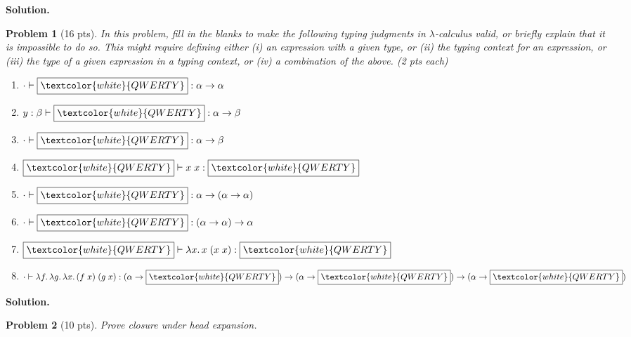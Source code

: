 \documentclass{article}
\newcommand{\lc}{$\lambda$-calculus}
\newcommand{\elam}[2]{\lambda{#1}.\,{#2}}
\newcommand{\eapp}[2]{#1 \; #2}
\newcommand{\emptybox}{\boxed{\textcolor{white}{QWERTY}}}
\newtheorem{problem}{Problem}
\newenvironment{solution}{\textbf{Solution.}}{}
\begin{document}
\begin{solution}

\end{solution}


\begin{problem}[16 pts]
    In this problem, fill in the blanks to make the following typing judgments in \lc{} valid, or briefly explain
    that it is impossible to do so. This might require defining either (i) an expression with a given type,
    or (ii) the typing context for an expression,
    or (iii) the type of a given expression in a typing context,
    or (iv) a combination of the above. (2 pts each)

    \begin{enumerate}
        \item $\cdot \vdash \emptybox : \alpha \rightarrow \alpha$
        
        \item $y : \beta \vdash \emptybox : \alpha \rightarrow \beta$
        
        \item $\cdot \vdash \emptybox : \alpha \rightarrow \beta$
        
        \item $\emptybox \vdash \eapp{x}{x} : \emptybox$
        
        \item $\cdot \vdash \emptybox : \alpha \rightarrow (\alpha \rightarrow \alpha)$
        
        \item $\cdot \vdash \emptybox : (\alpha \rightarrow \alpha) \rightarrow \alpha$
        
        \item $\emptybox \vdash \elam{x}{\eapp{x}{(\eapp{x}{x})}} : \emptybox$
        
        \item $\cdot \vdash \elam{f}{\elam{g}{\elam{x}{\eapp{(\eapp{f}{x})}{(\eapp{g}{x})}}}} : (\alpha \rightarrow \emptybox) \rightarrow (\alpha \rightarrow \emptybox) \rightarrow (\alpha \rightarrow \emptybox)$
        
    \end{enumerate}
\end{problem}

\begin{solution}
  
\end{solution}

\begin{problem}[10 pts]
  Prove closure under head expansion.
\end{problem}
\end{document}
